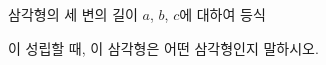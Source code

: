 삼각형의 세 변의 길이 $a$, $b$, $c$에 대하여 등식\par\smallskip{}\par\smallskip\noindent 이 성립할 때, 이 삼각형은 어떤 삼각형인지 말하시오.
